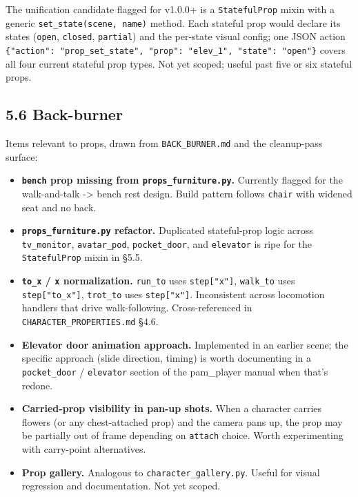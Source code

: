 \documentclass[
  11pt,
]{book}
\providecommand{\tightlist}{%
  \setlength{\itemsep}{0pt}\setlength{\parskip}{0pt}}
\begin{document}
The unification candidate flagged for v1.0.0+ is a \texttt{StatefulProp}
mixin with a generic \texttt{set\_state(scene,\ name)} method. Each
stateful prop would declare its states (\texttt{open}, \texttt{closed},
\texttt{partial}) and the per-state visual config; one JSON action
\texttt{\{"action":\ "prop\_set\_state",\ "prop":\ "elev\_1",\ "state":\ "open"\}}
covers all four current stateful prop types. Not yet scoped; useful past
five or six stateful props.

\subsection{5.6 Back-burner}\label{back-burner}

Items relevant to props, drawn from \texttt{BACK\_BURNER.md} and the
cleanup-pass surface:

\begin{itemize}
\tightlist
\item
  \textbf{\texttt{bench} prop missing from
  \texttt{props\_furniture.py}.} Currently flagged for the walk-and-talk
  -\textgreater{} bench rest design. Build pattern follows
  \texttt{chair} with widened seat and no back.
\item
  \textbf{\texttt{props\_furniture.py} refactor.} Duplicated
  stateful-prop logic across \texttt{tv\_monitor}, \texttt{avatar\_pod},
  \texttt{pocket\_door}, and \texttt{elevator} is ripe for the
  \texttt{StatefulProp} mixin in §5.5.
\item
  \textbf{\texttt{to\_x} / \texttt{x} normalization.} \texttt{run\_to}
  uses \texttt{step{[}"x"{]}}, \texttt{walk\_to} uses
  \texttt{step{[}"to\_x"{]}}, \texttt{trot\_to} uses
  \texttt{step{[}"x"{]}}. Inconsistent across locomotion handlers that
  drive walk-following. Cross-referenced in
  \texttt{CHARACTER\_PROPERTIES.md} §4.6.
\item
  \textbf{Elevator door animation approach.} Implemented in an earlier
  scene; the specific approach (slide direction, timing) is worth
  documenting in a \texttt{pocket\_door} / \texttt{elevator} section of
  the pam\_player manual when that's redone.
\item
  \textbf{Carried-prop visibility in pan-up shots.} When a character
  carries flowers (or any chest-attached prop) and the camera pans up,
  the prop may be partially out of frame depending on \texttt{attach}
  choice. Worth experimenting with carry-point alternatives.
\item
  \textbf{Prop gallery.} Analogous to \texttt{character\_gallery.py}.
  Useful for visual regression and documentation. Not yet scoped.
\end{itemize}
\end{document}
